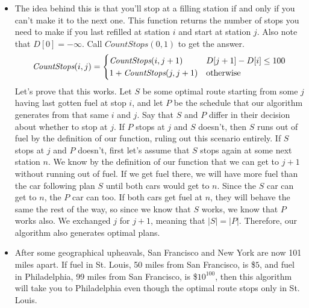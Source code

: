 \documentclass[11pt]{article}
\begin{document}
\begin{solution}
    \begin{itemize}
    \item The idea behind this is that you'll stop at a filling station if and only if you can't make it to the next one. This function returns the number of stops you need to make if you last
        refilled at station $i$ and start at station $j$. Also note that $D[0] = -\infty$. Call $CountStops(0, 1)$ to get the answer.
        \[
            \emph{CountStops}(i, j) = 
            \begin{cases} 
                \emph{CountStops}(i, j + 1) & D[j + 1] - D[i] \leq 100 \\
                            1 + \emph{CountStops}(j, j + 1) & \text{otherwise}
            \end{cases}
            \]
        Let's prove that this works. Let $S$ be some optimal route starting from some $j$ having last gotten fuel at stop $i$, and let $P$ be the schedule that our algorithm generates from that same $i$ and $j$. Say that $S$ and $P$ differ in their decision about whether to stop at $j$. If $P$ stops at $j$ and $S$ doesn't, then $S$ runs out of fuel by the definition of our function, ruling out this scenario entirely. 
            If $S$ stops at $j$ and $P$ doesn't, first let's assume that $S$ stops again at some next station $n$. We know by the definition of our function that we can get to $j + 1$ without running out of fuel. If we get fuel there, we will have more fuel than the car following plan $S$ until both cars would get to $n$. Since the $S$ car can get to $n$, the $P$ car can too. If both cars get fuel at $n$, they will behave the same the rest of the way, so since we know that $S$ works, we know that $P$ works also. We exchanged $j$ for $j + 1$, meaning that $|S| = |P|$. Therefore, our algorithm also generates optimal plans.
        \item After some geographical upheavals, San Francisco and New York are now 101 miles apart. If fuel in St. Louis, 50 miles from San Francisco, is \$$5$, and fuel in Philadelphia, 99 miles from San Francisco, is \$$10^{100}$, then this algorithm will take you to Philadelphia even though the optimal route stops only in St. Louis.
    \end{itemize}
\end{solution}

\end{document}
